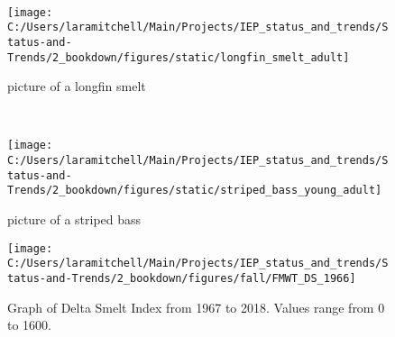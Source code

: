 \documentclass[
]{book}
\begin{document}
\begin{panel-grid}
\begin{columns-nocenter}
\begin{column40}
~

\end{column40}

\begin{column800}

\begin{figure}

{\centering \texttt{[image: C:/Users/laramitchell/Main/Projects/IEP\_status\_and\_trends/Status-and-Trends/2\_bookdown/figures/static/longfin\_smelt\_adult]} 

}

\caption{picture of a longfin smelt}\label{fig:unnamed-chunk-122}
\end{figure}

\end{column800}

\begin{column40}

~

\end{column40}

\begin{column800}

\begin{figure}

{\centering \texttt{[image: C:/Users/laramitchell/Main/Projects/IEP\_status\_and\_trends/Status-and-Trends/2\_bookdown/figures/static/striped\_bass\_young\_adult]} 

}

\caption{picture of a striped bass}\label{fig:unnamed-chunk-123}
\end{figure}

\end{column800}

\end{columns-nocenter}

\begin{columns-nocenter}

\begin{column800}

\begin{expand}

\begin{figure}
\texttt{[image: C:/Users/laramitchell/Main/Projects/IEP\_status\_and\_trends/Status-and-Trends/2\_bookdown/figures/fall/FMWT\_DS\_1966]} \caption{Graph of Delta Smelt Index from 1967 to 2018. Values range from 0 to 1600.}\label{fig:unnamed-chunk-124}
\end{figure}


\end{expand}
\end{column800}
\end{columns-nocenter}
\end{panel-grid}
\end{document}
